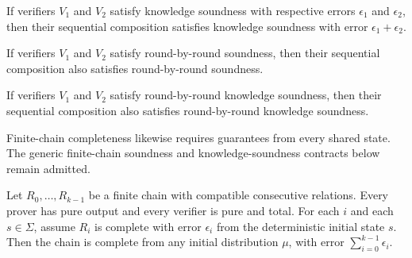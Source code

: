 \begin{theorem}
    \label{thm:knowledge_soundness_append}
    If verifiers $V_1$ and $V_2$ satisfy knowledge soundness with respective errors $\epsilon_1$ and $\epsilon_2$, then their sequential composition satisfies knowledge soundness with error $\epsilon_1 + \epsilon_2$.
\end{theorem}

\begin{theorem}
    \label{thm:rbr_soundness_append}
    If verifiers $V_1$ and $V_2$ satisfy round-by-round soundness, then their sequential composition also satisfies round-by-round soundness.
\end{theorem}

\begin{theorem}
    \label{thm:rbr_knowledge_soundness_append}
    If verifiers $V_1$ and $V_2$ satisfy round-by-round knowledge soundness, then their sequential composition also satisfies round-by-round knowledge soundness.
\end{theorem}

Finite-chain completeness likewise requires guarantees from every shared state.
The generic finite-chain soundness and knowledge-soundness contracts below remain admitted.

\begin{theorem}
    \label{thm:completeness_compose}
    Let $R_0, \ldots, R_{k-1}$ be a finite chain with compatible consecutive relations.
    Every prover has pure output and every verifier is pure and total.
    For each $i$ and each $s \in \Sigma$, assume $R_i$ is complete with error $\epsilon_i$
    from the deterministic initial state $s$. Then the chain is complete from any initial
    distribution $\mu$, with error $\sum_{i=0}^{k-1} \epsilon_i$.
\end{theorem}

\begin{theorem}
    \label{thm:soundness_compose}
\end{theorem}

